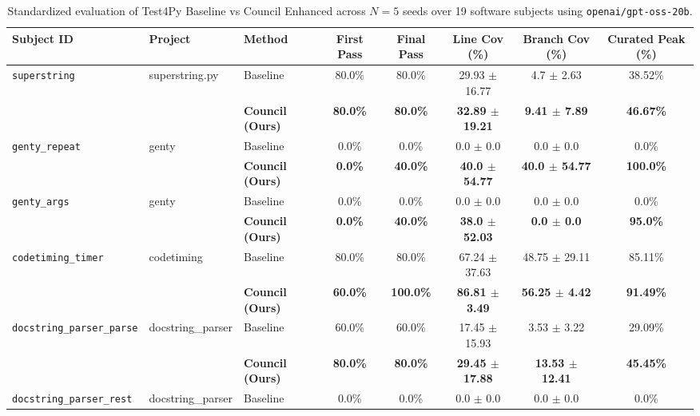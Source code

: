 \begin{table}[t]
\centering
\small
\caption{Standardized evaluation of Test4Py Baseline vs Council Enhanced across $N=5$ seeds over 19 software subjects using \texttt{openai/gpt-oss-20b}.}
\label{tab:standardized_19_eval}
\begin{tabular}{lll c c c c c}
\toprule
\textbf{Subject ID} & \textbf{Project} & \textbf{Method} & \textbf{First Pass} & \textbf{Final Pass} & \textbf{Line Cov (\%)} & \textbf{Branch Cov (\%)} & \textbf{Curated Peak (\%)} \\
\midrule
\multirow{2}{*}{\texttt{superstring}} & \multirow{2}{*}{superstring.py} & Baseline & 80.0\% & 80.0\% & 29.93 $\pm$ 16.77 & 4.7 $\pm$ 2.63 & 38.52\% \\
 & & \textbf{Council (Ours)} & \textbf{80.0\%} & \textbf{80.0\%} & \textbf{32.89 $\pm$ 19.21} & \textbf{9.41 $\pm$ 7.89} & \textbf{46.67\%} \\
\midrule
\multirow{2}{*}{\texttt{genty\_repeat}} & \multirow{2}{*}{genty} & Baseline & 0.0\% & 0.0\% & 0.0 $\pm$ 0.0 & 0.0 $\pm$ 0.0 & 0.0\% \\
 & & \textbf{Council (Ours)} & \textbf{0.0\%} & \textbf{40.0\%} & \textbf{40.0 $\pm$ 54.77} & \textbf{40.0 $\pm$ 54.77} & \textbf{100.0\%} \\
\midrule
\multirow{2}{*}{\texttt{genty\_args}} & \multirow{2}{*}{genty} & Baseline & 0.0\% & 0.0\% & 0.0 $\pm$ 0.0 & 0.0 $\pm$ 0.0 & 0.0\% \\
 & & \textbf{Council (Ours)} & \textbf{0.0\%} & \textbf{40.0\%} & \textbf{38.0 $\pm$ 52.03} & \textbf{0.0 $\pm$ 0.0} & \textbf{95.0\%} \\
\midrule
\multirow{2}{*}{\texttt{codetiming\_timer}} & \multirow{2}{*}{codetiming} & Baseline & 80.0\% & 80.0\% & 67.24 $\pm$ 37.63 & 48.75 $\pm$ 29.11 & 85.11\% \\
 & & \textbf{Council (Ours)} & \textbf{60.0\%} & \textbf{100.0\%} & \textbf{86.81 $\pm$ 3.49} & \textbf{56.25 $\pm$ 4.42} & \textbf{91.49\%} \\
\midrule
\multirow{2}{*}{\texttt{docstring\_parser\_parse}} & \multirow{2}{*}{docstring\_parser} & Baseline & 60.0\% & 60.0\% & 17.45 $\pm$ 15.93 & 3.53 $\pm$ 3.22 & 29.09\% \\
 & & \textbf{Council (Ours)} & \textbf{80.0\%} & \textbf{80.0\%} & \textbf{29.45 $\pm$ 17.88} & \textbf{13.53 $\pm$ 12.41} & \textbf{45.45\%} \\
\midrule
\multirow{2}{*}{\texttt{docstring\_parser\_rest}} & \multirow{2}{*}{docstring\_parser} & Baseline & 0.0\% & 0.0\% & 0.0 $\pm$ 0.0 & 0.0 $\pm$ 0.0 & 0.0\% \\

\end{tabular}
\end{table}
